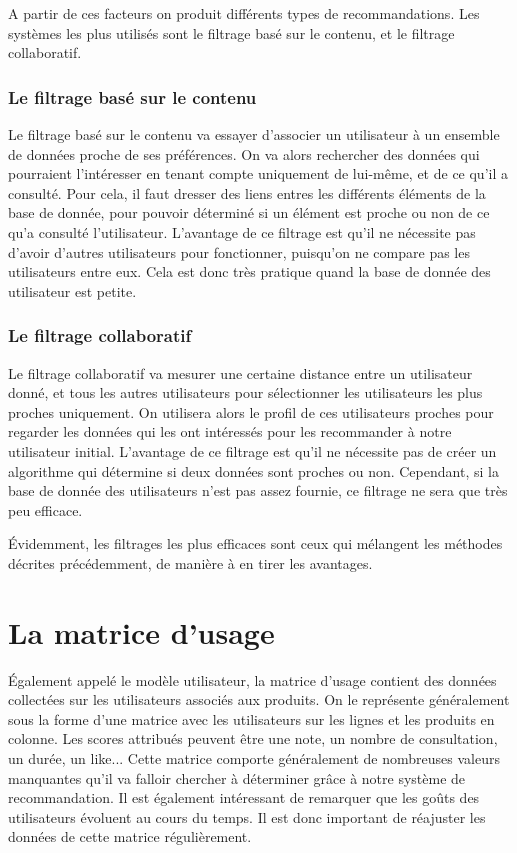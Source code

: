 \documentclass{report}
\begin{document}
A partir de ces facteurs on produit différents types de recommandations.
Les systèmes les plus utilisés sont le filtrage basé sur le contenu, et le filtrage collaboratif.

\subsubsection{Le filtrage basé sur le contenu}
Le filtrage basé sur le contenu va essayer d'associer un utilisateur à un ensemble de données proche de ses préférences. On va alors rechercher des données qui pourraient l'intéresser en tenant compte uniquement de lui-même, et de ce qu'il a consulté. Pour cela, il faut dresser des liens entres les différents éléments de la base de donnée, pour pouvoir déterminé si un élément est proche ou non de ce qu'a consulté l'utilisateur.
L'avantage de ce filtrage est qu'il ne nécessite pas d'avoir d'autres utilisateurs pour fonctionner, puisqu'on ne compare pas les utilisateurs entre eux. Cela est donc très pratique quand la base de donnée des utilisateur est petite.
\subsubsection{Le filtrage collaboratif}
Le filtrage collaboratif va mesurer une certaine distance entre un utilisateur donné, et tous les autres utilisateurs pour sélectionner les utilisateurs les plus proches uniquement.
On utilisera alors le profil de ces utilisateurs proches pour regarder les données qui les ont intéressés pour les recommander à notre utilisateur initial.
L'avantage de ce filtrage est qu'il ne nécessite pas de créer un algorithme qui détermine si deux données sont proches ou non. Cependant, si la base de donnée des utilisateurs n'est pas assez fournie, ce filtrage ne sera que très peu efficace.\par
Évidemment, les filtrages les plus efficaces sont ceux qui mélangent les méthodes décrites précédemment, de manière à en tirer les avantages.




\section{La matrice d'usage}
Également appelé le modèle utilisateur, la matrice d'usage contient des données collectées sur les utilisateurs associés aux produits. On le représente généralement sous la forme d'une matrice avec les utilisateurs sur les lignes et les produits en colonne. Les scores attribués peuvent être une note, un nombre de consultation, un durée, un like... Cette matrice comporte généralement de nombreuses valeurs manquantes qu'il va falloir chercher à déterminer grâce à notre système de recommandation.  Il est également intéressant de remarquer que les goûts des utilisateurs évoluent au cours du temps. Il est donc important de réajuster les données de cette matrice régulièrement.
\end{document}
